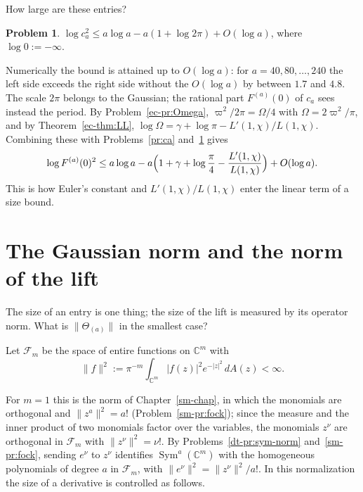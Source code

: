 \documentclass[reqno]{amsart}
\newcounter{chap}
\theoremstyle{definition}
\newtheorem{problem}{Problem}[section]
\theoremstyle{plain}
\newcommand{\C}{\mathbb{C}}
\newcommand{\Fc}{\mathcal{F}}
\newcommand{\Sym}{\operatorname{Sym}}
\begin{document}
How large are these entries?

\begin{problem}\label{pr:ca-size}
\(\log c_a^2 \le a \log a - a(1 + \log 2\pi) + O(\log a)\), where \(\log 0 := -\infty\).
\end{problem}

Numerically the bound is attained up to \(O(\log a)\): for \(a = 40, 80, \dots, 240\) the left side exceeds the right side without the \(O(\log a)\) by between \(1.7\) and \(4.8\).  The scale \(2\pi\) belongs to the Gaussian; the rational part \(F^{(a)}(0)\) of \(c_a\) sees instead the period.  By Problem~\ref{ec-pr:Omega}, \(\varpi^2/2\pi = \Omega/4\) with \(\Omega = 2\varpi^2/\pi\), and by Theorem~\ref{ec-thm:LL}, \(\log \Omega = \gamma + \log \pi - L'(1,\chi)/L(1,\chi)\).  Combining these with Problems~\ref{pr:ca} and~\ref{pr:ca-size} gives
\begin{equation}\label{eq:F-size}
  \log F^{(a)}(0)^2 \le a \log a - a\Bigl(1 + \gamma + \log\frac{\pi}{4} - \frac{L'(1,\chi)}{L(1,\chi)}\Bigr) + O(\log a) .
\end{equation}
This is how Euler's constant and \(L'(1,\chi)/L(1,\chi)\) enter the linear term of a size bound.

\section{The Gaussian norm and the norm of the lift}\label{sec:norm}

The size of an entry is one thing; the size of the lift is measured by its operator norm.  What is \(\lVert \Theta_{(a)} \rVert\) in the smallest case?

Let \(\Fc_m\) be the space of entire functions on \(\C^m\) with
\[
  \lVert f \rVert^2 := \pi^{-m}\int_{\C^m} \lvert f(z) \rvert^2 e^{-\lvert z\rvert^2} \, dA(z) < \infty .
\]

For \(m = 1\) this is the norm of Chapter~\ref{sm-chap}, in which the monomials are orthogonal and \(\lVert z^a \rVert^2 = a!\) (Problem~\ref{sm-pr:fock}); since the measure and the inner product of two monomials factor over the variables, the monomials \(z^\nu\) are orthogonal in \(\Fc_m\) with \(\lVert z^\nu \rVert^2 = \nu!\).
By Problems~\ref{dt-pr:sym-norm} and~\ref{sm-pr:fock}, sending \(e^\nu\) to \(z^\nu\) identifies \(\Sym^a(\C^m)\) with the homogeneous polynomials of degree \(a\) in \(\Fc_m\), with \(\lVert e^\nu \rVert^2 = \lVert z^\nu \rVert^2/a!\).  In this normalization the size of a derivative is controlled as follows.
\end{document}
